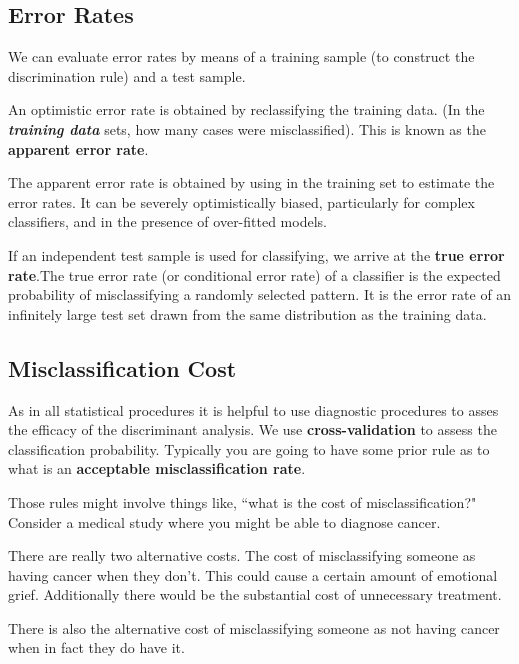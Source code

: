 \documentclass[a4paper,12pt]{article}
\begin{document}
\subsection{Error Rates}

We can evaluate error rates by means of a training sample (to construct the discrimination rule) and a test sample.


An optimistic error rate is obtained by reclassifying the training data. (In the \textbf{\textit{training data}} sets, how many cases were misclassified). This is known as the \textbf{apparent error rate}.


The apparent error rate is obtained by using in the training set to estimate
the error rates. It can be severely optimistically biased, particularly for complex classifiers, and in the presence of over-fitted models.


If an independent test sample is used for classifying, we arrive at the  \textbf{true error rate}.The true error rate (or conditional error rate) of a classifier is the expected
probability of misclassifying a randomly selected pattern.
It is the error rate of an infinitely large test set drawn from the same distribution as the training data.




\subsection{Misclassification Cost}

As in all statistical procedures it is helpful to use diagnostic procedures to asses the efficacy of the discriminant analysis. We use \textbf{cross-validation} to assess the classification probability.
Typically you are going to have some prior rule as to what is an \textbf{acceptable misclassification rate}.

Those rules might involve things like, ``what is the cost of misclassification?" Consider a medical study where you might be able to diagnose cancer.

There are really two alternative costs. The cost of misclassifying someone as having cancer when they don't.
This could cause a certain amount of emotional grief. Additionally there would be the substantial cost of unnecessary treatment.

There is also the alternative cost of misclassifying someone as not having cancer when in fact they do have it.
\end{document}

